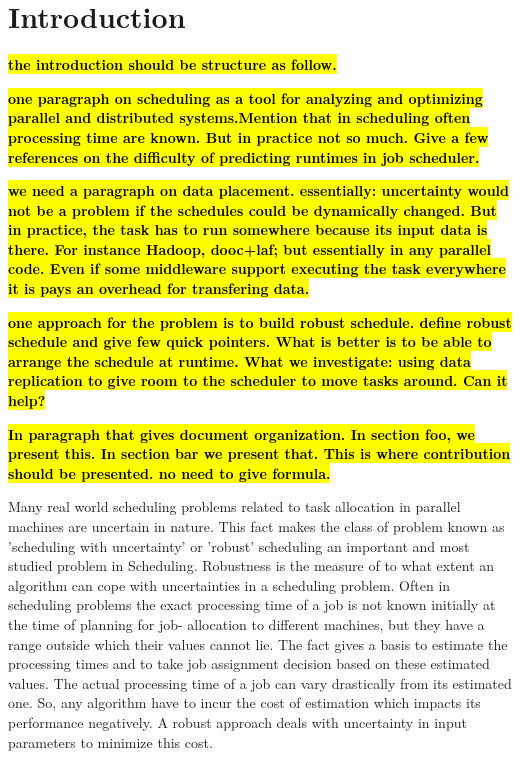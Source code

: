 \documentclass[10pt, conference, compsocconf]{IEEEtran}
\newcommand{\todo}[1]{{\color{red}\textbf{\hl{#1}}\xspace}}
\begin{document}
\IEEEpeerreviewmaketitle

\section{Introduction}

\todo{the introduction should be structure as follow.}

\todo{one paragraph on scheduling as a tool for analyzing and
  optimizing parallel and distributed systems.Mention that in
  scheduling often processing time are known. But in practice not so
  much. Give a few references on the difficulty of predicting runtimes
  in job scheduler.}

\todo{we need a paragraph on data placement. essentially: uncertainty
  would not be a problem if the schedules could be dynamically
  changed. But in practice, the task has to run somewhere because its
  input data is there. For instance Hadoop, dooc+laf; but essentially
  in any parallel code. Even if some middleware support executing the
  task everywhere it is pays an overhead for transfering data.}

\todo{one approach for the problem is to build robust schedule. define
  robust schedule and give few quick pointers. What is better is to be
  able to arrange the schedule at runtime. What we investigate: using
  data replication to give room to the scheduler to move tasks
  around. Can it help?}

\todo{In paragraph that gives document organization. In section foo,
  we present this. In section bar we present that. This is where
  contribution should be presented. no need to give formula.}

Many real world scheduling problems related to task allocation in
parallel machines are uncertain in nature. This fact makes the class
of problem known as 'scheduling with uncertainty' or 'robust'
scheduling an important and most studied problem in
Scheduling. Robustness is the measure of to what extent an algorithm
can cope with uncertainties in a scheduling problem. Often in
scheduling problems the exact processing time of a job is not known
initially at the time of planning for job- allocation to different
machines, but they have a range outside which their values cannot
lie. The fact gives a basis to estimate the processing times and to
take job assignment decision based on these estimated values. The
actual processing time of a job can vary drastically from its
estimated one. So, any algorithm have to incur the cost of estimation
which impacts its performance negatively. A robust approach deals with
uncertainty in input parameters to minimize this cost.
\end{document}
